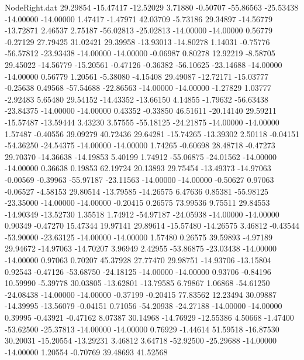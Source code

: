 \begin{filecontents}{NodeRight.dat}
  29.29854  -15.47417  -12.52029     3.71880   -0.50707  -55.86563  -25.53438  -14.00000  -14.00000    1.47417   -1.47971   42.03709   -5.73186
  29.34897  -14.56779  -13.72871     2.46537    2.75187  -56.02813  -25.02813  -14.00000  -14.00000    0.56779   -0.27129   27.79425   31.02421
  29.39958  -13.93013  -14.80278     1.14031   -0.75776  -56.57812  -23.93438  -14.00000  -14.00000   -0.06987    0.80278   12.92219   -8.58705
  29.45022  -14.56779  -15.20561    -0.47126   -0.36382  -56.10625  -23.14688  -14.00000  -14.00000    0.56779    1.20561   -5.38080   -4.15408
  29.49087  -12.72171  -15.03777    -0.25638    0.49568  -57.54688  -22.86563  -14.00000  -14.00000   -1.27829    1.03777   -2.92483    5.65480
  29.54152  -14.43352  -13.66150     4.14855   -1.79632  -56.63438  -23.84375  -14.00000  -14.00000    0.43352   -0.33850   46.51611  -20.14140
  29.59211  -15.57487  -13.59444     3.43230    3.57555  -55.18125  -24.21875  -14.00000  -14.00000    1.57487   -0.40556   39.09279   40.72436
  29.64281  -15.74265  -13.39302     2.50118   -0.04151  -54.36250  -24.54375  -14.00000  -14.00000    1.74265   -0.60698   28.48718   -0.47273
  29.70370  -14.36638  -14.19853     5.40199    1.74912  -55.06875  -24.01562  -14.00000  -14.00000    0.36638    0.19853   62.19724   20.13893
  29.75454  -13.49373  -14.97063    -0.00569   -0.39963  -55.97187  -23.11563  -14.00000  -14.00000   -0.50627    0.97063   -0.06527   -4.58153
  29.80514  -13.79585  -14.26575     6.47636    0.85381  -55.98125  -23.35000  -14.00000  -14.00000   -0.20415    0.26575   73.99536    9.75511
  29.84553  -14.90349  -13.52730     1.35518    1.74912  -54.97187  -24.05938  -14.00000  -14.00000    0.90349   -0.47270   15.47344   19.97141
  29.89614  -15.57480  -14.26575     3.46812   -0.43544  -53.90000  -23.63125  -14.00000  -14.00000    1.57480    0.26575   39.59893   -4.97189
  29.94672  -14.97063  -14.70207     3.96949    2.42955  -53.86875  -23.03438  -14.00000  -14.00000    0.97063    0.70207   45.37928   27.77470
  29.98751  -14.93706  -13.15804     0.92543   -0.47126  -53.68750  -24.18125  -14.00000  -14.00000    0.93706   -0.84196   10.59990   -5.39778
  30.03805  -13.62801  -13.79585     6.79867    1.06868  -54.61250  -24.08438  -14.00000  -14.00000   -0.37199   -0.20415   77.83562   12.23494
  30.09887  -14.39995  -13.56079    -0.04151    0.71056  -54.20938  -24.27188  -14.00000  -14.00000    0.39995   -0.43921   -0.47162    8.07387
  30.14968  -14.76929  -12.55386     4.50668   -1.47400  -53.62500  -25.37813  -14.00000  -14.00000    0.76929   -1.44614   51.59518  -16.87530
  30.20031  -15.20554  -13.29231     3.46812    3.64718  -52.92500  -25.29688  -14.00000  -14.00000    1.20554   -0.70769   39.48693   41.52568

\end{filecontents}
